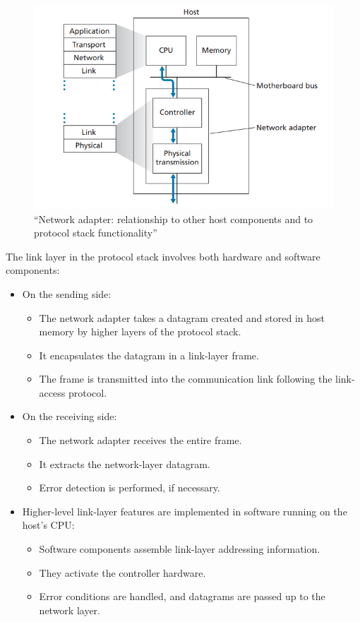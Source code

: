 \begin{figure}[H]
    \centering
    \includegraphics[width = 0.75\linewidth]{img/5/network-adapter.png}
    \caption{``Network adapter: relationship to other host components and to protocol stack functionality''\cite{Kurose2017}}
    \label{fig:network-adapter}
\end{figure}

\newpage
\noindent The link layer in the protocol stack involves both hardware and software components:
\begin{itemize}
    \item On the sending side:
    \begin{itemize}[nolistsep, noitemsep]
        \item The network adapter takes a datagram created and stored in host memory by higher layers of the protocol stack.
        \item It encapsulates the datagram in a link-layer frame.
        \item The frame is transmitted into the communication link following the link-access protocol.
    \end{itemize}
    \item On the receiving side:
    \begin{itemize}[nolistsep, noitemsep]
        \item The network adapter receives the entire frame.
        \item It extracts the network-layer datagram.
        \item Error detection is performed, if necessary.
    \end{itemize}
    \item Higher-level link-layer features are implemented in software running on the host's CPU:
    \begin{itemize}[nolistsep, noitemsep]
        \item Software components assemble link-layer addressing information.
        \item They activate the controller hardware.
        \item Error conditions are handled, and datagrams are passed up to the network layer.
    \end{itemize}
\end{itemize}

